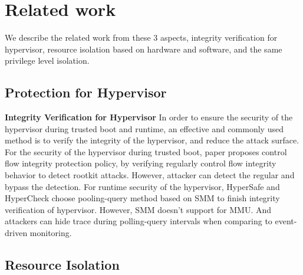 \documentclass[conference]{IEEEtran}
\begin{document}
\section{Related work}
We describe the related work from these 3 aspects, integrity verification for hypervisor, resource isolation based on hardware and software, and the same privilege level isolation.

\subsection{Protection for Hypervisor}

\textbf{Integrity Verification for Hypervisor}
In order to ensure the security of the hypervisor during trusted boot and runtime, an effective and commonly used method is to verify the integrity of the hypervisor, and reduce the attack surface. For the security of the hypervisor during trusted boot, paper \cite{Petroni2007Automated} proposes control flow integrity protection policy, by verifying regularly control flow integrity behavior to detect rootkit attacks. However, attacker can detect the regular and bypass the detection. For runtime security of the hypervisor, HyperSafe \cite{Wang2010HyperSafe} and HyperCheck \cite{Wang2010HyperCheck} choose pooling-query method based on SMM to finish integrity verification of hypervisor. However, SMM doesn't support for MMU. And attackers can hide trace during polling-query intervals when comparing to event-driven monitoring.

\subsection{Resource Isolation}
\end{document}
